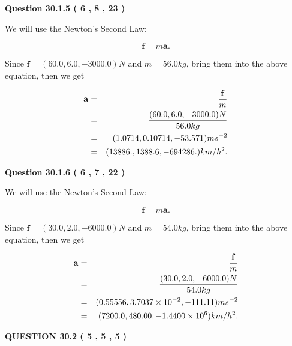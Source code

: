 \documentclass[12pt]{article}
\begin{document}
 
 
 
  
\vspace{0.2in}
  
{\textbf{\Large{Question
30.1.5 
 (           6 ,           8 ,          23 )
}}}
  
  
 
 

We will use the Newton's Second Law:
 
\[
\mathbf{f}=m\mathbf{a}.
\]
 
Since $\mathbf{f}=( %
60.0,  %
6.0,  %
-3000.0 )N$
and $m= %
56.0kg$, bring them into the above equation, then we get
 
\begin{eqnarray*}
\mathbf{a}&=&\frac{\mathbf{f}}m  \\
&=&\frac{(
60.0 ,
6.0 ,
-3000.0 )N
}{ %
56.0 kg}  \\
&=&(
1.0714 ,
0.10714,
-53.571
)ms^{-2} \\
&=&(
13886. ,
1388.6 ,
-694286.
)km/h^2.
\end{eqnarray*}
 
 
 
  
\vspace{0.2in}
  
{\textbf{\Large{Question
30.1.6 
 (           6 ,           7 ,          22 )
}}}
  
  
 
 

We will use the Newton's Second Law:
 
\[
\mathbf{f}=m\mathbf{a}.
\]
 
Since $\mathbf{f}=( %
30.0,  %
2.0,  %
-6000.0 )N$
and $m= %
54.0 kg$, bring them into the above equation, then we get
 
\begin{eqnarray*}
\mathbf{a}&=&\frac{\mathbf{f}}m  \\
&=&\frac{(
30.0 ,
2.0 ,
-6000.0 )N
}{ %
54.0 kg}  \\
&=&(
0.55556 ,
3.7037 \times 10^{-2},
-111.11
)ms^{-2} \\
&=&(
7200.0 ,
480.00 ,
-1.4400 \times 10^{6}
)km/h^2.
\end{eqnarray*}
 
 
 
  
\vspace{0.2in}
  
{\textbf{\Large{QUESTION
30.2 
 (           5 ,           5 ,           5 )
}}}
  
  
  
\end{document}
